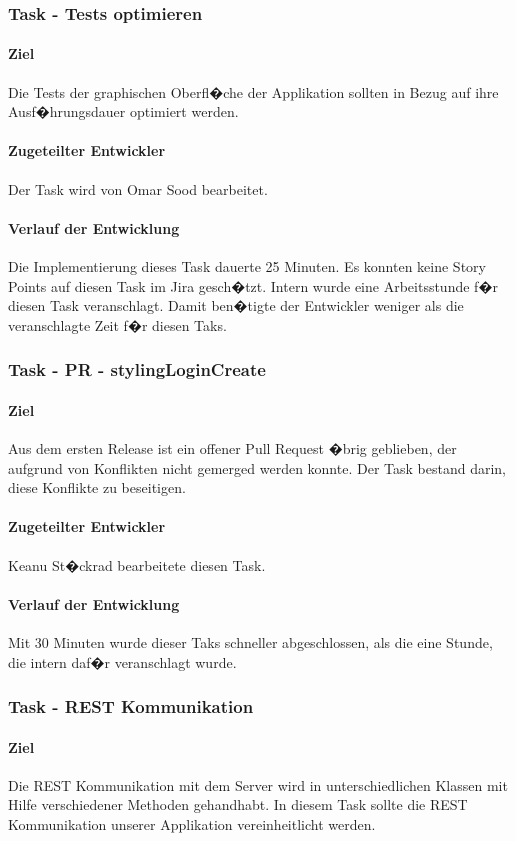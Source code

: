 \documentclass[12pt, titlepage]{scrartcl}
\begin{document}
		\subsubsection{Task - Tests optimieren}
		\paragraph{Ziel} Die Tests der graphischen Oberfl�che der Applikation sollten in Bezug auf ihre Ausf�hrungsdauer optimiert werden.
		\paragraph{Zugeteilter Entwickler} Der Task wird von Omar Sood bearbeitet.
		\paragraph{Verlauf der Entwicklung} 
		Die Implementierung dieses Task dauerte 25 Minuten. Es konnten keine Story Points auf diesen Task im Jira gesch�tzt. Intern wurde eine Arbeitsstunde f�r diesen Task veranschlagt. Damit ben�tigte der Entwickler weniger als die veranschlagte Zeit f�r diesen Taks.
		\subsubsection{Task - PR - stylingLoginCreate}
		\paragraph{Ziel} Aus dem ersten Release ist ein offener Pull Request �brig geblieben, der aufgrund von Konflikten nicht gemerged werden konnte. Der Task bestand darin, diese Konflikte zu beseitigen.
		\paragraph{Zugeteilter Entwickler} Keanu St�ckrad bearbeitete diesen Task.
		\paragraph{Verlauf der Entwicklung} 
		Mit 30 Minuten wurde dieser Taks schneller abgeschlossen, als die eine Stunde, die intern daf�r veranschlagt wurde.
		\subsubsection{Task - REST Kommunikation}
		\paragraph{Ziel} Die REST Kommunikation mit dem Server wird in unterschiedlichen Klassen mit Hilfe verschiedener Methoden gehandhabt. In diesem Task sollte die REST Kommunikation unserer Applikation vereinheitlicht werden.
\end{document}
